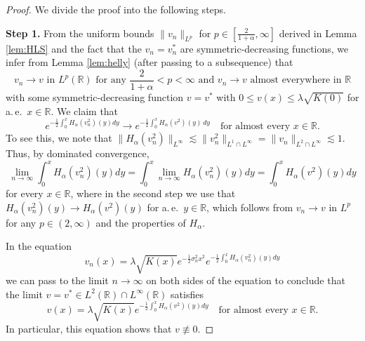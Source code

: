 \documentclass[reqno,10pt,a4paper]{amsart}
\theoremstyle{definition}
\theoremstyle{definition}
\theoremstyle{remark}
\theoremstyle{remark}
\numberwithin{equation}{section}
\newcommand{\R}{\mathbb{R}}
\newcommand{\be}{\begin{equation}}
\newcommand{\ee}{\end{equation}}
\begin{document}
\begin{proof}
We divide the proof into the following steps.

\medskip
\textbf{Step 1.} From the uniform bounds $\| v_n \|_{L^p}$ for $p \in [\frac{2}{1+\alpha}, \infty]$ derived in Lemma \ref{lem:HLS} and the fact that the $v_n = v_n^*$ are symmetric-decreasing functions, we infer from Lemma \ref{lem:helly} (after passing to a subsequence) that
\be
\mbox{$v_n \to v$ in $L^p(\R)$ for any $\frac{2}{1+\alpha} < p < \infty$ and $v_n \to v$ almost everywhere in $\R$}
\ee
with some symmetric-decreasing function $v=v^*$ with $0 \leq v(x) \leq \lambda \sqrt{K(0)}$ for a.\,e.~$x \in \R$. We claim that
$$
e^{-\frac{1}{2} \int_0^x H_\alpha(v_n^2)(y) dy }\to e^{-\frac{1}{2} \int_0^x H_\alpha(v^2)(y) \,dy } \quad \mbox{for almost every $x \in \R$}.
$$ 
To see this, we note that $\| H_\alpha(v_n^2) \|_{L^\infty} \lesssim \| v_n^2 \|_{L^1 \cap L^\infty} = \| v_n \|_{L^2 \cap L^\infty} \lesssim 1$. Thus, by dominated convergence,
$$
\lim_{n \to \infty} \int_0^x H_\alpha(v_n^2)(y) dy = \int_0^x \lim_{n \to \infty} H_\alpha(v_n^2)(y) dy = \int_0^x H_\alpha(v^2)(y) dy
$$
for every $x \in \R$, where in the second step we use that $H_\alpha(v_n^2)(y)\to H_\alpha(v^2)(y)$ for a.\,e.~$y \in \R$, which follows from $v_n \to v$ in $L^p$ for any $p \in (2, \infty)$ and the properties of $H_\alpha$.

In the equation
\be \label{eq:vn}
v_n(x) = \lambda \sqrt{K(x)} e^{-\frac{1}{2} \sigma_n^2 x^2} e^{-\frac{1}{2} \int_0^x H_\alpha(v_n^2)(y) dy}
\ee
we can pass to the limit $n \to \infty$ on both sides of the equation to conclude that the limit $v=v^* \in L^2(\R) \cap L^\infty(\R)$ satisfies
\be \label{eq:limit}
v(x) = \lambda \sqrt{K(x)} e^{-\frac{1}{2} \int_0^x H_\alpha(v^2)(y) dy} \quad \mbox{for almost every $x \in \R$}.
\ee
In particular, this equation shows that $v \not \equiv 0$.
 

\end{proof}
\end{document}
